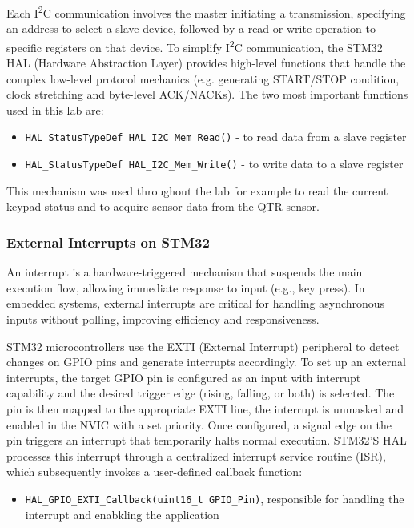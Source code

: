 \noindent
Each I\textsuperscript{2}C communication involves the master initiating a transmission, specifying an address to select a slave device, followed by a read or write operation to specific registers on that device. 
\noindent
To simplify I\textsuperscript{2}C communication, the STM32 HAL (Hardware Abstraction Layer) provides high-level functions that handle the complex low-level protocol mechanics (e.g. generating START/STOP condition, clock stretching and byte-level ACK/NACKs). The two most important functions used in this lab are:


\begin{itemize}
    \item \texttt{HAL\_StatusTypeDef HAL\_I2C\_Mem\_Read()} - to read data from a slave register
    \item \texttt{HAL\_StatusTypeDef HAL\_I2C\_Mem\_Write()} - to write data to a slave register
\end{itemize}

This mechanism was used throughout the lab for example to read the current keypad status and to acquire sensor data from the QTR sensor.


\subsubsection{External Interrupts on STM32}

An interrupt is a hardware-triggered mechanism that suspends the main execution flow, allowing immediate response to input (e.g., key press). In embedded systems, external interrupts are critical for handling asynchronous inputs without polling, improving efficiency and responsiveness. 

STM32 microcontrollers use the EXTI (External Interrupt) peripheral to detect changes on GPIO pins and generate interrupts accordingly. To set up an external interrupts, the target GPIO pin is configured as an input with interrupt capability and the desired trigger edge (rising, falling, or both) is selected. The pin is then mapped to the appropriate EXTI line, the interrupt is unmasked and enabled in the NVIC with a set priority. Once configured, a signal edge on the pin triggers an interrupt that temporarily halts normal execution. STM32'S HAL processes this interrupt through a centralized interrupt service routine (ISR), which subsequently invokes a user-defined callback function: 

\begin{itemize}
    \item \texttt{HAL\_GPIO\_EXTI\_Callback(uint16\_t GPIO\_Pin)}, responsible for handling the interrupt and enabkling the application
\end{itemize}






